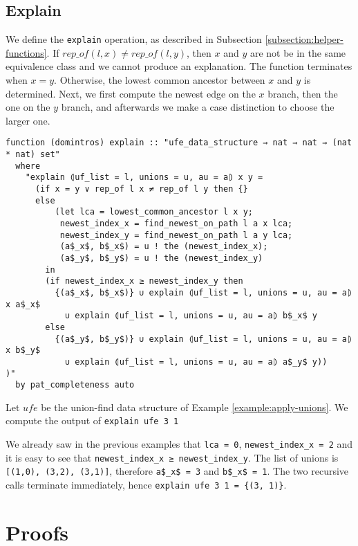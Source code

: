 \subsection{Explain}

We define the \lstinline|explain| operation, as described in Subsection \ref{subsection:helper-functions}.
If $rep\_of(l, x) \neq rep\_of(l, y)$, then $x$ and $y$ are not be in the same equivalence class and we cannot produce an explanation.
The function terminates when $x = y$.
Otherwise, the lowest common ancestor between $x$ and $y$ is determined.
Next, we first compute the newest edge on the $x$ branch, then the one on the $y$ branch, and afterwards we make a case distinction to choose the larger one.

\begin{lstlisting}
function (domintros) explain :: "ufe_data_structure ⇒ nat ⇒ nat ⇒ (nat * nat) set"
  where
    "explain ⦇uf_list = l, unions = u, au = a⦈ x y =
      (if x = y ∨ rep_of l x ≠ rep_of l y then {}
      else
          (let lca = lowest_common_ancestor l x y;
           newest_index_x = find_newest_on_path l a x lca;
           newest_index_y = find_newest_on_path l a y lca;
           (a$_x$, b$_x$) = u ! the (newest_index_x);
           (a$_y$, b$_y$) = u ! the (newest_index_y)
        in
        (if newest_index_x ≥ newest_index_y then
          {(a$_x$, b$_x$)} ∪ explain ⦇uf_list = l, unions = u, au = a⦈ x a$_x$
            ∪ explain ⦇uf_list = l, unions = u, au = a⦈ b$_x$ y
        else
          {(a$_y$, b$_y$)} ∪ explain ⦇uf_list = l, unions = u, au = a⦈ x b$_y$
            ∪ explain ⦇uf_list = l, unions = u, au = a⦈ a$_y$ y))
)"
  by pat_completeness auto
\end{lstlisting}

\begin{exmp}
Let $ufe$ be the union-find data structure of Example \ref{example:apply-unions}. We compute the output of \lstinline|explain ufe 3 1|

We already saw in the previous examples that \lstinline|lca = 0|, \lstinline|newest_index_x = 2|
and it is easy to see that \lstinline|newest_index_x ≥ newest_index_y|. The list of unions is \lstinline|[(1,0), (3,2), (3,1)]|, therefore \lstinline|a$_x$ = 3| and \lstinline|b$_x$ = 1|. The two recursive calls terminate immediately, hence \lstinline|explain ufe 3 1 = {(3, 1)}|.
\end{exmp}

\section{Proofs}

